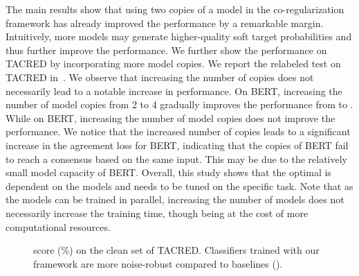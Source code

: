 \documentclass[11pt]{article}
\newcommand{\stitle}[1]{\vspace{0.3em}\noindent{\bf #1}}
\begin{document}
\stitle{Using extra model copies.} The main results show that using two copies of a model in the co-regularization framework has already improved the performance by a remarkable margin.
Intuitively, more models may generate higher-quality soft target probabilities and thus further improve the performance.
We further show the performance on TACRED by incorporating more model copies.
We report the relabeled test  on TACRED in~.
We observe that increasing the number of copies does not necessarily lead to a notable increase in performance.
On BERT, increasing the number of model copies from 2 to 4 gradually improves the performance from  to .
While on BERT, increasing the number of model copies does not improve the performance.
We notice that the increased number of copies leads to a significant increase in the agreement loss for BERT, indicating that the copies of BERT fail to reach a consensus based on the same input.
This may be due to the relatively small model capacity of BERT.
Overall, this study shows that the optimal  is dependent on the models and needs to be tuned on the specific task.
Note that as the models can be trained in parallel, increasing the number of models does not necessarily increase the training time, though being at the cost of more computational resources.


\begin{figure}[t!]
    \centering
\caption{ score (\%) on the clean set of TACRED. Classifiers trained with our framework are more noise-robust compared to baselines ().}\label{fig:noise}
\end{figure}

\begin{table}[t]
    \centering
    \caption{ score (\%) of using different number of models on the relabeled test set of TACRED.}
    \label{tab:more_models}
\end{table}
\end{document}
